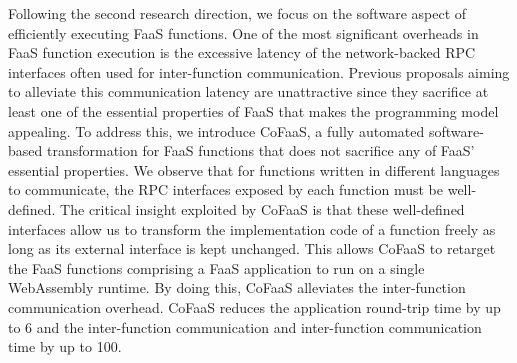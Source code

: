 \documentclass[../main.tex]{subfiles}
\begin{document}
Following the second research direction, we focus on the software
aspect of efficiently executing FaaS functions. One of the most
significant overheads in FaaS function execution is the excessive
latency of the network-backed RPC interfaces often used for
inter-function communication. Previous proposals aiming to alleviate
this communication latency are unattractive since they sacrifice at
least one of the essential properties of FaaS that makes the
programming model appealing. To address this, we introduce CoFaaS, a
fully automated software-based transformation for FaaS functions that
does not sacrifice any of FaaS' essential properties. We observe that
for functions written in different languages to communicate, the RPC
interfaces exposed by each function must be well-defined. The critical
insight exploited by CoFaaS is that these well-defined interfaces
allow us to transform the implementation code of a function freely as
long as its external interface is kept unchanged. This allows CoFaaS
to retarget the FaaS functions comprising a FaaS application to run on
a single WebAssembly runtime. By doing this, CoFaaS alleviates the
inter-function communication overhead. CoFaaS reduces the application
round-trip time by up to 6\texttimes{} and the inter-function
communication and inter-function communication time by up to
100\texttimes{}.
\end{document}
